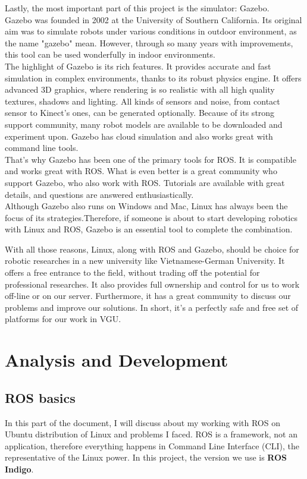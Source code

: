 \documentclass[pdftex,12pt,a4paper]{article}
\begin{document}
  Lastly, the most important part of this project is the simulator: Gazebo.\\
  Gazebo was founded in 2002 at the University of Southern California. Its original aim was to simulate robots under various conditions in outdoor environment, as the name "gazebo" mean. However, through so many years with improvements, this tool can be used wonderfully in indoor environments.\\
  The highlight of Gazebo is its rich features. It provides accurate and fast simulation in complex environments, thanks to its robust physics engine. It offers advanced 3D graphics, where rendering is so realistic with all high quality textures, shadows and lighting. All kinds of sensors and noise, from contact sensor to Kinect's ones, can be generated optionally. Because of its strong support community, many robot models are available to be downloaded and experiment upon. Gazebo has cloud simulation and also works great with command line tools.\\
  That's why Gazebo has been one of the primary tools for ROS. It is compatible and works great with ROS. What is even better is a great community who support Gazebo, who also work with ROS. Tutorials are available with great details, and questions are answered enthusiastically.\\
  Although Gazebo also runs on Windows and Mac, Linux has always been the focus of its strategies.Therefore, if someone is about to start developing robotics with Linux and ROS, Gazebo is an essential tool to complete the combination.\par
  With all those reasons, Linux, along with ROS and Gazebo, should be choice for robotic researches in a new university like Vietnamese-German University. It offers a free entrance to the field, without trading off the potential for professional researches. It also provides full ownership and control for us to work off-line or on our server. Furthermore, it has a great community to discuss our problems and improve our solutions. In short, it's a perfectly safe and free set of platforms for our work in VGU.
    
  \newpage
  \section{Analysis and Development}
  \subsection{ROS basics}
  In this part of the document, I will discuss about my working with ROS on Ubuntu distribution of Linux and problems I faced. ROS is a framework, not an application, therefore everything happens in Command Line Interface (CLI), the representative of the Linux power. In this project, the version we use is \textbf{ROS Indigo}.
\end{document}
